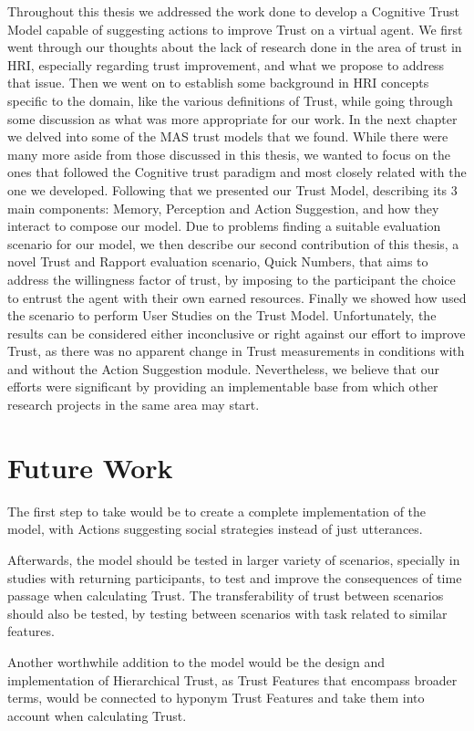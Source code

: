 \label{chap:Conclusions}
Throughout this thesis we addressed the work done to develop a Cognitive Trust Model capable of suggesting actions to improve Trust on a virtual agent. We first went through our thoughts about the lack of research done in the area of trust in \ac{HRI}, especially regarding trust improvement, and what we propose to address that issue. Then we went on to establish some background in \ac{HRI} concepts specific to the domain, like the various definitions of Trust, while going through some discussion as what was more appropriate for our work. In the next chapter we delved into some of the MAS trust models that we found. While there were many more aside from those discussed in this thesis, we wanted to focus on the ones that followed the Cognitive trust paradigm and most closely related with the one we developed. Following that we presented our Trust Model, describing its 3 main components: Memory, Perception and Action Suggestion, and how they interact to compose our model. Due to problems finding a suitable evaluation scenario for our model, we then describe our second contribution of this thesis, a novel Trust and Rapport evaluation scenario, Quick Numbers, that aims to address the willingness factor of trust, by imposing to the participant the choice to entrust the agent with their own earned resources. Finally we showed how used the scenario to perform User Studies on the Trust Model. Unfortunately, the results can be considered either inconclusive or right against our effort to improve Trust, as there was no apparent change in Trust measurements in conditions with and without the Action Suggestion module. Nevertheless, we believe that our efforts were significant by providing an implementable base from which other research projects in the same area may start. 


\section{Future Work}
The first step to take would be to create a complete implementation of the model, with Actions suggesting social strategies instead of just utterances. 

Afterwards, the model should be tested in larger variety of scenarios, specially in studies with returning participants, to test and improve the consequences of time passage when calculating Trust. The transferability of trust between scenarios should also be tested, by testing between scenarios with task related to similar features.

Another worthwhile addition to the model would be the design and implementation of Hierarchical Trust, as Trust Features that encompass broader terms, would be connected to hyponym Trust Features and take them into account when calculating Trust.
